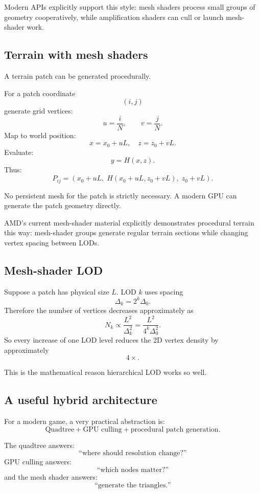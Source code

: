 \documentclass[12pt]{article}
\begin{document}
	Modern APIs explicitly support this style: mesh shaders process small groups of geometry cooperatively, while amplification shaders can cull or launch mesh-shader work.
	
	\subsection{Terrain with mesh shaders}
	
	A terrain patch can be generated procedurally.
	
	For a patch coordinate
	\[
	(i,j)
	\]
	generate grid vertices:
	\[
	u=\frac{i}{N}, \qquad v=\frac{j}{N}.
	\]
	Map to world position:
	\[
	x=x_0+uL,\quad z=z_0+vL.
	\]
	Evaluate:
	\[
	\boxed{
		y=H(x,z).
	}
	\]
	Thus:
	\[
	\boxed{
		P_{ij}=
		(x_0+uL,\; H(x_0+uL,z_0+vL),\; z_0+vL).
	}
	\]
	
	No persistent mesh for the patch is strictly necessary.
	A modern GPU can generate the patch geometry directly.
	
	AMD's current mesh-shader material explicitly demonstrates procedural terrain this way: mesh-shader groups generate regular terrain sections while changing vertex spacing between LODs.
	
	\subsection{Mesh-shader LOD}
	
	Suppose a patch has physical size $L$.
	LOD $k$ uses spacing
	\[
	\boxed{
		\Delta_k=2^k\Delta_0.
	}
	\]
	Therefore the number of vertices decreases approximately as
	\[
	N_k \propto \frac{L^2}{\Delta_k^2} = \frac{L^2}{4^k\Delta_0^2}.
	\]
	So every increase of one LOD level reduces the 2D vertex density by approximately
	\[
	\boxed{4\times}.
	\]
	
	This is the mathematical reason hierarchical LOD works so well.
	
	\subsection{A useful hybrid architecture}
	
	For a modern game, a very practical abstraction is:
	\[
	\boxed{
		\text{Quadtree} + \text{GPU culling} + \text{procedural patch generation}.
	}
	\]
	
	The quadtree answers:
	\[
	\text{``where should resolution change?''}
	\]
	GPU culling answers:
	\[
	\text{``which nodes matter?''}
	\]
	and the mesh shader answers:
	\[
	\text{``generate the triangles.''}
	\]
	
\end{document}
